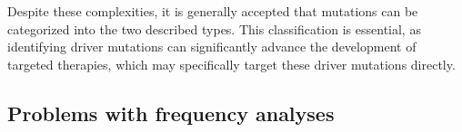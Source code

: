 Despite these complexities, it is generally accepted that mutations can be categorized into the two described types. This classification is essential, as identifying driver mutations can significantly advance the development of targeted therapies, which may specifically target these driver mutations directly.


%
%
%

\subsection{Problems with frequency analyses}

